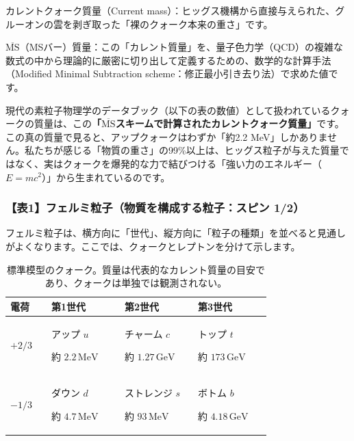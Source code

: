カレントクォーク質量（Current mass）：ヒッグス機構から直接与えられた、グルーオンの雲を剥ぎ取った「裸のクォーク本来の重さ」です。

\(\overline{\mathrm{MS}}\)（MSバー）質量：この「カレント質量」を、量子色力学（QCD）の複雑な数式の中から理論的に厳密に切り出して定義するための、数学的な計算手法（Modified Minimal Subtraction scheme：修正最小引き去り法）で求めた値です。

現代の素粒子物理学のデータブック（以下の表の数値）として扱われているクォークの質量は、この\textbf{「\(\overline{\mathrm{MS}}\)スキームで計算されたカレントクォーク質量」}です。この真の質量で見ると、アップクォークはわずか「約2.2 MeV」しかありません。私たちが感じる「物質の重さ」の99\%以上は、ヒッグス粒子が与えた質量ではなく、実はクォークを爆発的な力で結びつける「強い力のエネルギー（\(E=mc^2\)）」から生まれているのです。


\subsubsection{【表1】フェルミ粒子（物質を構成する粒子：スピン 1/2）}

フェルミ粒子は、横方向に「世代」、縦方向に「粒子の種類」を並べると見通しがよくなります。ここでは、クォークとレプトンを分けて示します。

\begin{table}[htbp]
\centering
\small
\setlength{\tabcolsep}{4pt}
\renewcommand{\arraystretch}{1.25}
\begin{tabular}{p{0.14\linewidth}p{0.25\linewidth}p{0.25\linewidth}p{0.25\linewidth}}
\hline
電荷 & 第1世代 & 第2世代 & 第3世代 \\
\hline
\(+2/3\) & アップ \(u\)\par 約 \(2.2\,\mathrm{MeV}\) & チャーム \(c\)\par 約 \(1.27\,\mathrm{GeV}\) & トップ \(t\)\par 約 \(173\,\mathrm{GeV}\) \\
\(-1/3\) & ダウン \(d\)\par 約 \(4.7\,\mathrm{MeV}\) & ストレンジ \(s\)\par 約 \(93\,\mathrm{MeV}\) & ボトム \(b\)\par 約 \(4.18\,\mathrm{GeV}\) \\
\hline
\end{tabular}
\caption{標準模型のクォーク。質量は代表的なカレント質量の目安であり、クォークは単独では観測されない。}
\end{table}

